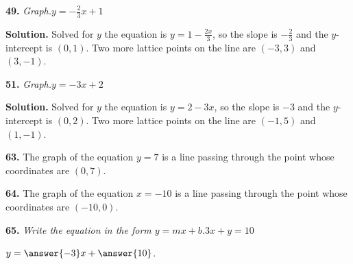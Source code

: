 \documentclass{ximera}
\begin{document}
\begin{problem}
\textbf{49.} \emph{Graph.}\quad $y = -\frac{2}{3}x + 1$ \figbox{\gridsm}

\begin{hint}
\textbf{Solution.} Solved for $y$ the equation is $y=1 -\frac{2x}{3}$, so the slope is $-\frac{2}{3}$ and the $y$-intercept is $(0,1)$. Two more lattice points on the line are $(-3,3)$ and $(3,-1)$.
\end{hint}
\end{problem}

\begin{problem}
\textbf{51.} \emph{Graph.}\quad $y = -3x + 2$       \figbox{\gridsm}

\begin{hint}
\textbf{Solution.} Solved for $y$ the equation is $y=2 - 3x$, so the slope is $-3$ and the $y$-intercept is $(0,2)$. Two more lattice points on the line are $(-1,5)$ and $(1,-1)$.
\end{hint}
\end{problem}

\begin{problem}
\textbf{63.} The graph of the equation $y = 7$ is a \blank{} line passing through the point
  whose coordinates are $(0, 7)$.

\begin{multipleChoice}
\end{multipleChoice}

\end{problem}

\begin{problem}
\textbf{64.} The graph of the equation $x = -10$ is a \blank{} line passing through the point
  whose coordinates are $(-10, 0)$.

\begin{multipleChoice}
\end{multipleChoice}

\end{problem}

\begin{problem}
\textbf{65.} \emph{Write the equation in the form $y = mx + b$.}\quad $3x + y = 10$

$y = \answer{-3}x + \answer{10}$.
\end{problem}
\end{document}
